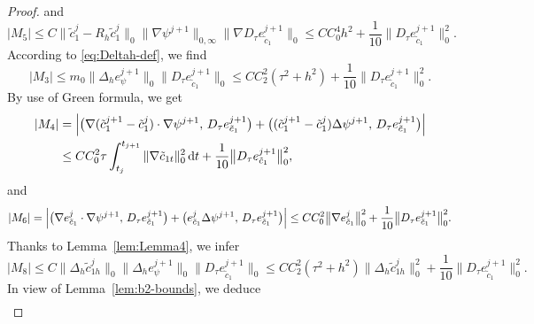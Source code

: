 \begin{proof}
and
\begin{equation}\label{eq:M5}
  |M_{5}|
  \leq C\bigl\|\tilde{c}_{1}^{j} - R_{h}\tilde{c}_{1}^{j}\bigr\|_{0}
         \bigl\|\nabla\psi^{j+1}\bigr\|_{0,\infty}
         \bigl\|\nabla D_{\tau}e_{\tilde{c}_{1}}^{j+1}\bigr\|_{0}
  \leq CC_{0}^{4}h^{2} + \frac{1}{10}\bigl\|D_{\tau}e_{\tilde{c}_{1}}^{j+1}\bigr\|_{0}^{2}.
\end{equation}
According to \eqref{eq:Deltah-def}, we find
\begin{equation}\label{eq:M3}
  |M_{3}|
  \leq m_{0}\bigl\|\Delta_{h}e_{\psi}^{j+1}\bigr\|_{0}
             \bigl\|D_{\tau}e_{\tilde{c}_{1}}^{j+1}\bigr\|_{0}
  \leq CC_{2}^{2}(\tau^{2}+h^{2})
     + \frac{1}{10}\bigl\|D_{\tau}e_{\tilde{c}_{1}}^{j+1}\bigr\|_{0}^{2}.
\end{equation}
By use of Green formula, we get
\begin{align}
  |M_{4}|
  &= \Bigl|\bigl(\nabla(\tilde{c}_{1}^{j+1} - \tilde{c}_{1}^{j})\cdot\nabla\psi^{j+1},\,
                 D_{\tau}e_{\tilde{c}_{1}}^{j+1}\bigr)
          + \bigl((\tilde{c}_{1}^{j+1} - \tilde{c}_{1}^{j})\Delta\psi^{j+1},\,
                 D_{\tau}e_{\tilde{c}_{1}}^{j+1}\bigr)\Bigr|
  \nonumber\\
  &\leq CC_{0}^{2}\tau\int_{t_{j}}^{t_{j+1}}\|\nabla\tilde{c}_{1t}\|_{0}^{2}\,\mathrm{d}t
     + \frac{1}{10}\bigl\|D_{\tau}e_{\tilde{c}_{1}}^{j+1}\bigr\|_{0}^{2},
  \label{eq:M4}
\end{align}
and
\begin{equation}\label{eq:M6}
  |M_{6}|
  = \Bigl|\bigl(\nabla e_{\tilde{c}_{1}}^{j}\cdot\nabla\psi^{j+1},\,
               D_{\tau}e_{\tilde{c}_{1}}^{j+1}\bigr)
         + \bigl(e_{\tilde{c}_{1}}^{j}\Delta\psi^{j+1},\,
               D_{\tau}e_{\tilde{c}_{1}}^{j+1}\bigr)\Bigr|
  \leq CC_{0}^{2}\bigl\|\nabla e_{\tilde{c}_{1}}^{j}\bigr\|_{0}^{2}
     + \frac{1}{10}\bigl\|D_{\tau}e_{\tilde{c}_{1}}^{j+1}\bigr\|_{0}^{2}.
\end{equation}
Thanks to Lemma~\ref{lem:Lemma4}, we infer
\begin{equation}\label{eq:M8}
  |M_{8}|
  \leq C\bigl\|\Delta_{h}\tilde{c}_{1h}^{j}\bigr\|_{0}
         \bigl\|\Delta_{h}e_{\psi}^{j+1}\bigr\|_{0}
         \bigl\|D_{\tau}e_{\tilde{c}_{1}}^{j+1}\bigr\|_{0}
  \leq CC_{2}^{2}(\tau^{2}+h^{2})\bigl\|\Delta_{h}\tilde{c}_{1h}^{j}\bigr\|_{0}^{2}
     + \frac{1}{10}\bigl\|D_{\tau}e_{\tilde{c}_{1}}^{j+1}\bigr\|_{0}^{2}.
\end{equation}
In view of Lemma~\ref{lem:b2-bounds}, we deduce
\begin{align}

\end{align}
\end{proof}
